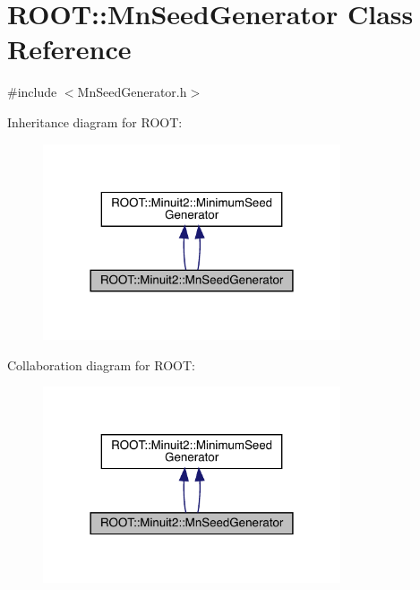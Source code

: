 \hypertarget{classROOT_1_1Minuit2_1_1MnSeedGenerator}{}\section{R\+O\+OT\+:\+:Mn\+Seed\+Generator Class Reference}
\label{classROOT_1_1Minuit2_1_1MnSeedGenerator}


{\ttfamily \#include $<$Mn\+Seed\+Generator.\+h$>$}



Inheritance diagram for R\+O\+OT\+:\nopagebreak
\begin{figure}[H]
\begin{center}
\leavevmode
\includegraphics[width=249pt]{da/d9c/classROOT_1_1Minuit2_1_1MnSeedGenerator__inherit__graph}
\end{center}
\end{figure}


Collaboration diagram for R\+O\+OT\+:\nopagebreak
\begin{figure}[H]
\begin{center}
\leavevmode
\includegraphics[width=249pt]{d1/d92/classROOT_1_1Minuit2_1_1MnSeedGenerator__coll__graph}
\end{center}
\end{figure}
